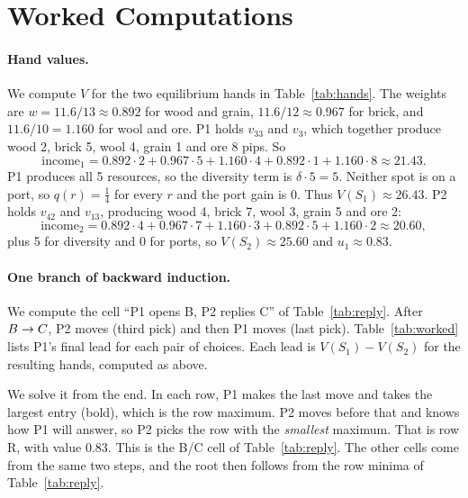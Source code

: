 \documentclass[11pt]{article}
\begin{document}
\section{Worked Computations}\label{app:work}
\paragraph{Hand values.} We compute $V$ for the two equilibrium hands in Table~\ref{tab:hands}. The weights are $w=11.6/13\approx0.892$ for wood and grain, $11.6/12\approx0.967$ for brick, and $11.6/10=1.160$ for wool and ore. P1 holds $v_{33}$ and $v_3$, which together produce wood 2, brick 5, wool 4, grain 1 and ore 8 pips. So
\[
\text{income}_1 = 0.892\cdot2 + 0.967\cdot5 + 1.160\cdot4 + 0.892\cdot1 + 1.160\cdot8 \approx 21.43 .
\]
P1 produces all 5 resources, so the diversity term is $\delta\cdot5=5$. Neither spot is on a port, so $q(r)=\tfrac14$ for every $r$ and the port gain is $0$. Thus $V(S_1)\approx26.43$. P2 holds $v_{42}$ and $v_{13}$, producing wood 4, brick 7, wool 3, grain 5 and ore 2:
\[
\text{income}_2 = 0.892\cdot4 + 0.967\cdot7 + 1.160\cdot3 + 0.892\cdot5 + 1.160\cdot2 \approx 20.60 ,
\]
plus 5 for diversity and $0$ for ports, so $V(S_2)\approx25.60$ and $u_1\approx0.83$.

\paragraph{One branch of backward induction.} We compute the cell ``P1 opens B, P2 replies C'' of Table~\ref{tab:reply}. After $\workedprefix$, P2 moves (third pick) and then P1 moves (last pick). Table~\ref{tab:worked} lists P1's final lead for each pair of choices. Each lead is $V(S_1)-V(S_2)$ for the resulting hands, computed as above.
\begin{table}[h]\centering\small
\workedtable
\caption{After $\workedprefix$: P1's lead for each third pick by P2 (row) and last pick by P1 (column). Bold: P1's best last pick. Boxed: P2's best third pick.}\label{tab:worked}
\end{table}

\noindent We solve it from the end. In each row, P1 makes the last move and takes the largest entry (bold), which is the row maximum. P2 moves before that and knows how P1 will answer, so P2 picks the row with the \emph{smallest} maximum. That is row R, with value $0.83$. This is the B/C cell of Table~\ref{tab:reply}. The other cells come from the same two steps, and the root then follows from the row minima of Table~\ref{tab:reply}.
\end{document}
